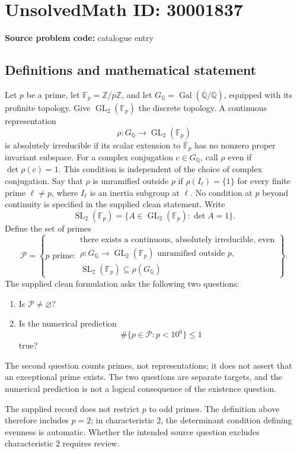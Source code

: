 \documentclass[11pt]{article}
\newcommand{\Z}{\mathbb{Z}}
\newcommand{\Q}{\mathbb{Q}}
\newcommand{\F}{\mathbb{F}}
\begin{document}
\section*{UnsolvedMath ID: 30001837}
\textbf{Source problem code:} catalogue entry
\subsection{Definitions and mathematical statement}
Let \(p\) be a prime, let \(\F_p=\Z/p\Z\), and let \(G_{\Q}=\operatorname{Gal}(\overline{\Q}/\Q)\), equipped with its profinite topology. Give \(\operatorname{GL}_2(\F_p)\) the discrete topology. A continuous representation
\[
\rho:G_{\Q}\longrightarrow\operatorname{GL}_2(\F_p)
\]
is absolutely irreducible if its scalar extension to \(\overline{\F}_p\) has no nonzero proper invariant subspace. For a complex conjugation \(c\in G_{\Q}\), call \(\rho\) even if \(\det\rho(c)=1\). This condition is independent of the choice of complex conjugation. Say that \(\rho\) is unramified outside \(p\) if \(\rho(I_\ell)=\{1\}\) for every finite prime \(\ell\ne p\), where \(I_\ell\) is an inertia subgroup at \(\ell\). No condition at \(p\) beyond continuity is specified in the supplied clean statement. Write
\[
\operatorname{SL}_2(\F_p)=\{A\in\operatorname{GL}_2(\F_p):\det A=1\}.
\]
Define the set of primes
\[
\mathcal P=\left\{p\text{ prime}:\begin{array}{l}
\text{there exists a continuous, absolutely irreducible, even}\\
\rho:G_{\Q}\to\operatorname{GL}_2(\F_p)\text{ unramified outside }p,\\
\operatorname{SL}_2(\F_p)\subseteq\rho(G_{\Q})
\end{array}\right\}.
\]
The supplied clean formulation asks the following two questions:
\begin{enumerate}
\item Is \(\mathcal P\ne\varnothing\)?
\item Is the numerical prediction
\[
\#\{p\in\mathcal P:p<10^6\}\le1
\]
true?
\end{enumerate}
The second question counts primes, not representations; it does not assert that an exceptional prime exists. The two questions are separate targets, and the numerical prediction is not a logical consequence of the existence question.

The supplied record does not restrict \(p\) to odd primes. The definition above therefore includes \(p=2\); in characteristic \(2\), the determinant condition defining evenness is automatic. Whether the intended source question excludes characteristic \(2\) requires review.
\end{document}
